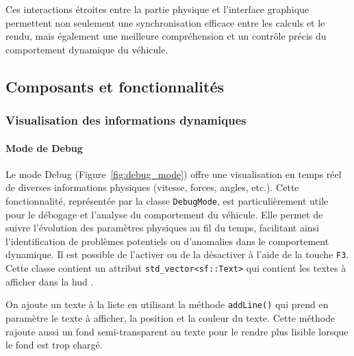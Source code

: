 Ces interactions étroites entre la partie physique et l'interface graphique permettent non seulement une synchronisation efficace entre les calculs et le rendu, mais également une meilleure compréhension et un contrôle précis du comportement dynamique du véhicule.


\subsection{Composants et fonctionnalités}\label{subsec:composants-et-fonctionnalites}

\subsubsection{Visualisation des informations dynamiques}\label{subsubsec:visualisation-des-informations-dynamiques}

\paragraph{Mode de Debug}
Le mode Debug (Figure~\ref{fig:debug_mode}) offre une visualisation en temps réel de diverses informations physiques (vitesse, forces, angles, etc.).
Cette fonctionnalité, représentée par la classe \texttt{DebugMode}, est particulièrement utile pour le débogage et l'analyse du comportement du véhicule.
Elle permet de suivre l'évolution des paramètres physiques au fil du temps, facilitant ainsi l'identification de problèmes potentiels ou d'anomalies dans le comportement dynamique.
Il est possible de l'activer ou de la désactiver à l'aide de la touche \texttt{F3}.
Cette classe contient un attribut \texttt{\gls{std_vector}<sf::Text>}\cite{cpp_reference_vector} qui contient les textes à afficher dans la \gls{hud} .

On ajoute un texte à la liste en utilisant la méthode \texttt{addLine()} qui prend en paramètre le texte à afficher, la position et la couleur du texte.
Cette méthode rajoute aussi un fond semi-transparent au texte pour le rendre plus lisible lorsque le fond est trop chargé.

